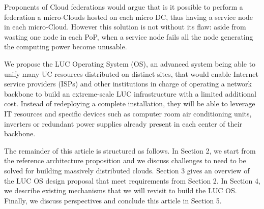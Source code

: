 Proponents of Cloud federations would argue that is it possible to perform
a federation a micro-Clouds hosted on each micro DC, thus having a service node
in each micro-Cloud. However this solution is not without its flaw: aside from
wasting one node in each PoP, when a service node fails all the node generating
the computing power become unusable.

We propose the LUC Operating System (OS), an advanced system being able to unify
many UC resources distributed on distinct sites, that would enable Internet service 
providers (ISPs) and other institutions in charge of operating a network 
backbone to build an extreme-scale LUC infrastructure with a limited additional 
cost. Instead of redeploying a complete installation, they will be able to 
leverage IT resources and specific devices such as computer room air 
conditioning units, inverters or redundant power supplies already present in 
each center of their backbone.

The remainder of this article is structured as follows. In Section 2, we start 
from the reference architecture proposition \cite{moreno2012iaas} and we discuss
challenges to need to be solved for building massively distributed clouds. 
Section 3 gives an overview of the LUC OS design proposal that meet requirements
from Section 2. In Section 4, we describe existing mechanisms that we will 
revisit to build the LUC OS. Finally, we discuss perspectives and conclude this 
article in Section 5.
